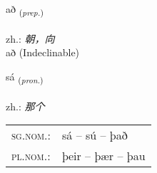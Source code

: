 \documentclass[frontgrid, backgrid]{flacards}\usepackage[]{graphicx}\usepackage[]{xcolor}
\begin{document}
\renewcommand{\blhead}{\vskip5pt {\small\bfseries\footnotesize Forsetning | 介词 }}
\renewcommand{\bcfoot}{\vskip5pt \hspace{2pt}{\small\bfseries\footnotesize 1K}}


{að \small{\textsubscript{(\textit{prep.})}} \\[1ex]
\textphonetic{[aːð]} \\
zh.: \emph{朝，向} \\  [2ex]
að (Indeclinable)}

\renewcommand{\flhead}{\vskip5pt \fboxsep=0pt {\small\bfseries\footnotesize Fornafn | 代词}}
\renewcommand{\fcfoot}{\vskip5pt \fboxsep=0pt \hspace{2pt}{\small\bfseries\footnotesize 1K}}

\renewcommand{\blhead}{\vskip5pt {\small\bfseries\footnotesize Fornafn | 代词 }}
\renewcommand{\bcfoot}{\vskip5pt \hspace{2pt}{\small\bfseries\footnotesize 1K}}


{sá \small{\textsubscript{(\textit{pron.})}} \\[1ex] %
\textphonetic{[sauː]} \\
zh.: \emph{那个} \\  [2ex]
\renewcommand*{\arraystretch}{0.8}
\begin{tabular}{ll}
\textsc{sg.nom.}: & sá  --  sú -- það \\ 
\textsc{pl.nom.}: & þeir -- þær -- þau
\end{tabular}
}

\renewcommand{\flhead}{\vskip5pt \fboxsep=0pt {\small\bfseries\footnotesize Sagnorð | 动词}}
\renewcommand{\fcfoot}{\vskip5pt \fboxsep=0pt \hspace{2pt}{\small\bfseries\footnotesize 1K}}

\renewcommand{\blhead}{\vskip5pt {\small\bfseries\footnotesize Sagnorð | 动词 }}
\renewcommand{\bcfoot}{\vskip5pt \hspace{2pt}{\small\bfseries\footnotesize 1K}}
\end{document}
